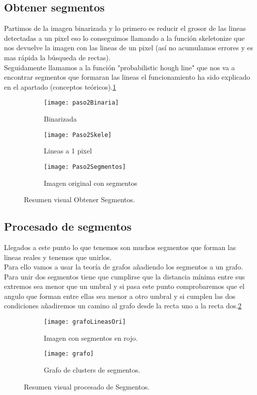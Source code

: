 \subsection{Obtener segmentos}
Partimos de la imagen binarizada y lo primero es reducir el grosor de las lineas detectadas a un pixel eso lo conseguimos llamando a la función skeletonize que nos devuelve la imagen con las lineas de un pixel (así no acumulamos errores y es mas rápida la búsqueda de rectas).\\
Seguidamente llamamos a la función "probabilistic hough line" que nos va a encontrar segmentos que formaran las lineas el funcionamiento ha sido explicado en el apartado (conceptos teóricos).\ref{fig:5.5}


\begin{figure}
\begin{subfigure}[c]{.5\linewidth}
\centering\large \texttt{[image: paso2Binaria]}
\caption{Binarizada}
\end{subfigure}%
\begin{subfigure}[c]{.5\linewidth}
\centering\large \texttt{[image: Paso2Skele]}
\caption{Lineas a 1 pixel}
\end{subfigure}
\begin{subfigure}[c]{.5\linewidth}
\centering\large \texttt{[image: Paso2Segmentos]}
\caption{Imagen original con segmentos}
\end{subfigure}
\caption{Resumen visual Obtener Segmentos.}\label{fig:5.5}
\end{figure}

\subsection{Procesado de segmentos}
Llegados a este punto lo que tenemos son muchos segmentos que forman las lineas reales y tenemos que unirlos.\\
Para ello vamos a usar la teoría de grafos añadiendo los segmentos a un grafo.\\
Para unir dos segmentos tiene que cumplirse que la distancia mínima entre sus extremos sea menor que un umbral y si pasa este punto comprobaremos que el angulo que forman entre ellas sea menor a otro umbral y si cumplen las dos condiciones añadiremos un camino al grafo desde la recta uno a la recta dos.\ref{fig:5.6}



\begin{figure}
\begin{subfigure}[b]{.5\linewidth}
\centering\large \texttt{[image: grafoLineasOri]}
\caption{Imagen con segmentos en rojo.}
\end{subfigure}
\begin{subfigure}[b]{.5\linewidth}
\centering\large \texttt{[image: grafo]}
\caption{Grafo de clusters de segmentos.}
\end{subfigure}
\caption{Resumen visual procesado de Segmentos.}\label{fig:5.6}
\end{figure}

